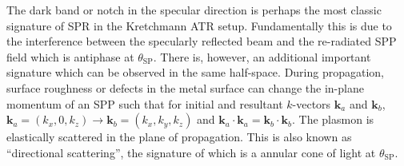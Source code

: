 The dark band or notch in the specular direction is perhaps the most
classic signature of SPR in the Kretchmann ATR setup.  Fundamentally this
is due to the interference between the specularly reflected beam and the
re-radiated SPP field which is antiphase at $\theta_\mathrm{SP}$.  There
is, however, an additional important signature which can be observed in the
same half-space.  During propagation, surface roughness or defects in the
metal surface can change the in-plane momentum of an SPP such that for
initial and resultant $k$-vectors $\mathbf{k}_a$ and $\mathbf{k}_b$,
$\mathbf{k}_a = (k_x,0,k_z) \to \mathbf{k}_b = (k_x,k_y,k_z)$ and
$\mathbf{k}_a\cdot\mathbf{k}_a = \mathbf{k}_b\cdot\mathbf{k}_b$.  The
plasmon is elastically scattered in the plane of propagation.  This is also
known as ``directional scattering'', the signature of which is a annular
cone of light at $\theta_\mathrm{SP}$.


